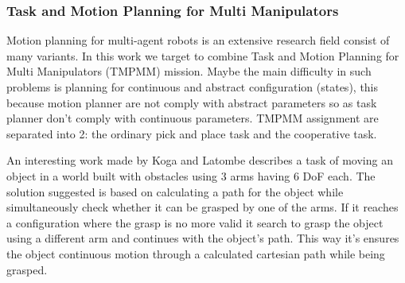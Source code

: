 \subsubsection*{Task and Motion Planning for Multi Manipulators}
Motion planning for multi-agent robots is an extensive research field consist of many variants. In this work we target to combine Task and Motion Planning for Multi Manipulators (TMPMM) mission. Maybe the main difficulty in such problems is planning for continuous and abstract configuration (states), this because motion planner are not comply with abstract parameters so as task planner don't comply with continuous parameters. TMPMM assignment are separated into 2: the ordinary pick and place task and the cooperative task. 

An interesting work made by Koga and Latombe \cite{koga1994multi} describes a task of moving an object in a world built with obstacles using 3 arms having 6 DoF each. The solution suggested is based on calculating a path for the object while simultaneously check whether it can be grasped by one of the arms. If it reaches a configuration where the grasp is no more valid it search to grasp the object using a different arm and continues with the object's path. This way it's ensures the object continuous motion through a calculated cartesian path while being grasped.

